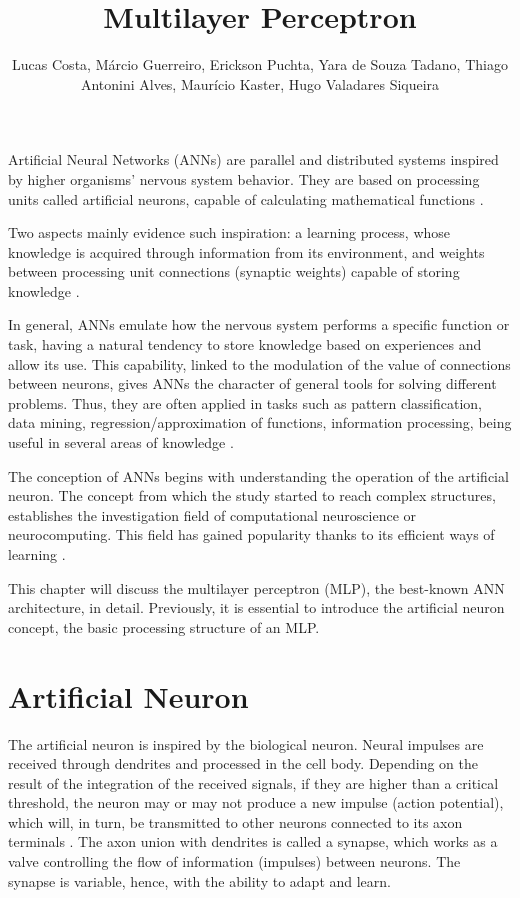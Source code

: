 \documentclass[ruled,graybox]{svmult}
\title{Multilayer Perceptron}
\author{Lucas Costa, Márcio Guerreiro, Erickson Puchta, Yara de Souza Tadano, Thiago Antonini Alves, Maurício Kaster, Hugo Valadares Siqueira}
\begin{document}


\maketitle

Artificial Neural Networks (ANNs) are parallel and distributed systems inspired by higher organisms' nervous system %
behavior. They are based on processing units called artificial neurons, capable of calculating mathematical functions \cite{haykin}.

Two aspects mainly evidence such inspiration: a learning process, whose knowledge is acquired through information from its environment, and weights between processing unit connections (synaptic weights) capable of storing knowledge \cite{Castro2006FundamentalsON}.

In general, ANNs emulate how the nervous system performs a specific function or task, having a natural %
tendency to store knowledge based on experiences and allow its use. This capability, linked to the modulation of the value of connections between neurons, gives ANNs the character of general tools for solving different problems. Thus, they are often applied in tasks such as pattern classification, data mining, regression/approximation of functions, information processing, being useful in several areas of knowledge \cite{haykin}.

The conception of ANNs begins with understanding the %
operation
of the artificial neuron. The concept from which the study started to reach complex structures, %
establishes the investigation field of computational neuroscience or neurocomputing. This field has gained popularity thanks to its efficient ways of learning \cite{Russell2009}.

This chapter will discuss the multilayer perceptron (MLP), the best-known ANN architecture, in detail. %
Previously, it is essential to introduce the artificial neuron concept, 
the basic processing structure of an MLP.


\section{Artificial Neuron}
\label{sec:neuronio}

The artificial neuron is inspired by the biological neuron. Neural impulses are received through dendrites and processed in the cell body. Depending on the result of the integration of the received signals, if they are %
higher than
a critical threshold, the neuron may or may not produce a new impulse (action potential), which will, in turn, be transmitted to other neurons connected to its axon terminals \cite{Castro2006FundamentalsON}. The axon union with dendrites is called a synapse, which works as a valve controlling the flow of information (impulses) between neurons. The synapse is variable, hence,
with
the ability to adapt and learn.
\end{document}
